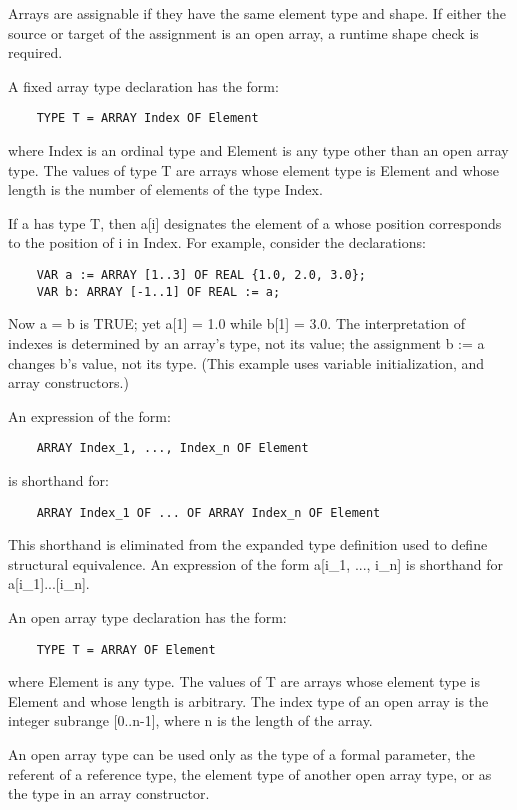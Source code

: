 \documentclass[10pt]{article}
\begin{document}
 Arrays are assignable if they have the same element type and shape. If either the source or target of the assignment is an open array, a runtime shape check is required. 


 A fixed array type declaration has the form: 
\begin{verbatim}
    TYPE T = ARRAY Index OF Element
\end{verbatim}
 where Index is an ordinal type and Element is any type other than an open array type. The values of type T are arrays whose element type is Element and whose length is the number of elements of the type Index. 


 If a has type T, then a[i] designates the element of a whose position corresponds to the position of i in Index. For example, consider the declarations: 
\begin{verbatim}
    VAR a := ARRAY [1..3] OF REAL {1.0, 2.0, 3.0};
    VAR b: ARRAY [-1..1] OF REAL := a;
\end{verbatim}
 Now a = b is TRUE; yet a[1] = 1.0 while b[1] = 3.0. The interpretation of indexes is determined by an array's type, not its value; the assignment b := a changes b's value, not its type. (This example uses variable initialization, and array constructors.) 


 An expression of the form: 
\begin{verbatim}
    ARRAY Index_1, ..., Index_n OF Element
\end{verbatim}
 is shorthand for: 
\begin{verbatim}
    ARRAY Index_1 OF ... OF ARRAY Index_n OF Element
\end{verbatim}



  This shorthand is eliminated from the expanded type definition used to define structural equivalence. An expression of the form a[i\_1, ..., i\_n] is shorthand for a[i\_1]...[i\_n]. 


 An open array type declaration has the form: 
\begin{verbatim}
    TYPE T = ARRAY OF Element
\end{verbatim}
 where Element is any type. The values of T are arrays whose element type is Element and whose length is arbitrary. The index type of an open array is the integer subrange [0..n-1], where n is the length of the array. 


  An open array type can be used only as the type of a formal parameter, the referent of a reference type, the element type of another open array type, or as the type in an array constructor. 
\end{document}
